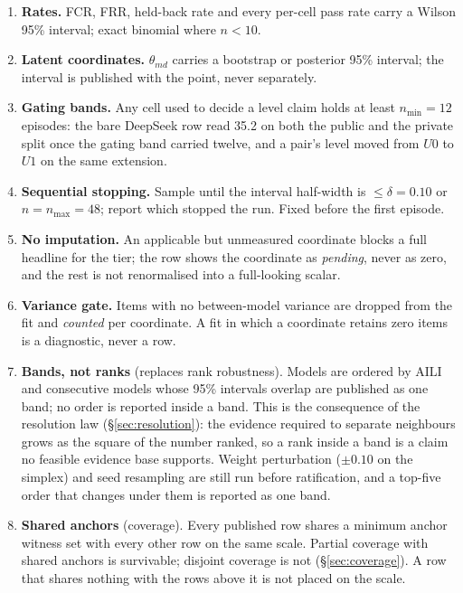 \documentclass[11pt]{article}
\theoremstyle{definition}
\begin{document}
\begin{enumerate}[leftmargin=1.6em,itemsep=2pt]
\item \textbf{Rates.} FCR, FRR, held-back rate and every per-cell pass rate carry a Wilson 95\% interval; exact binomial where $n < 10$.
\item \textbf{Latent coordinates.} $\theta_{md}$ carries a bootstrap or posterior 95\% interval; the interval is published with the point, never separately.
\item \textbf{Gating bands.} Any cell used to decide a level claim holds at least $n_{\min} = 12$ episodes: the bare DeepSeek row read 35.2 on both the public and the private split once the gating band carried twelve, and a pair's level moved from $U0$ to $U1$ on the same extension.
\item \textbf{Sequential stopping.} Sample until the interval half-width is $\le \delta = 0.10$ or $n = n_{\max} = 48$; report which stopped the run. Fixed before the first episode.
\item \textbf{No imputation.} An applicable but unmeasured coordinate blocks a full headline for the tier; the row shows the coordinate as \emph{pending}, never as zero, and the rest is not renormalised into a full-looking scalar.
\item \textbf{Variance gate.} Items with no between-model variance are dropped from the fit and \emph{counted} per coordinate. A fit in which a coordinate retains zero items is a diagnostic, never a row.
\item \textbf{Bands, not ranks} (replaces rank robustness). Models are ordered by $\mathrm{AILI}$ and consecutive models whose 95\% intervals overlap are published as one band; no order is reported inside a band. This is the consequence of the resolution law (\S\ref{sec:resolution}): the evidence required to separate neighbours grows as the square of the number ranked, so a rank inside a band is a claim no feasible evidence base supports. Weight perturbation ($\pm 0.10$ on the simplex) and seed resampling are still run before ratification, and a top-five order that changes under them is reported as one band.
\item \textbf{Shared anchors} (coverage). Every published row shares a minimum anchor witness set with every other row on the same scale. Partial coverage with shared anchors is survivable; disjoint coverage is not (\S\ref{sec:coverage}). A row that shares nothing with the rows above it is not placed on the scale.
\end{enumerate}
\end{document}
